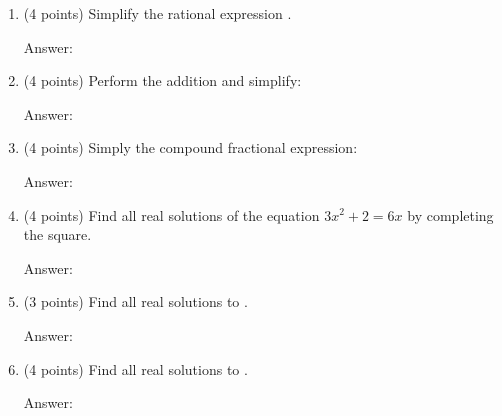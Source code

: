 \documentclass[11pt]{article}
\begin{document}
\begin{enumerate}
\item (4 points) Simplify the rational expression .\\
\begin{flushright}{Answer: \underline{\hspace{2in}}}\end{flushright}

\vspace{1in}

\item (4 points) Perform the addition and simplify: 
\begin{flushright}{Answer: \underline{\hspace{2in}}}\end{flushright}

\vspace{1in}

\item (4 points) Simply the compound fractional expression: 
\begin{flushright}{Answer: \underline{\hspace{2in}}}\end{flushright}

\vspace{1in}

\item  (4 points)  Find all real solutions of the equation $ 3x^2+2=6x$ by completing the square.
\begin{flushright}{Answer: \underline{\hspace{2in}}}\end{flushright}

\vfill

\newpage
\item (3 points) Find all real solutions to \scalebox{1.4}{$\vert 3x-5\vert=13$}.
\begin{flushright}{Answer: \underline{\hspace{2in}}}\end{flushright}

\vfill
\item (4 points) Find all real solutions to .
\begin{flushright}{Answer: \underline{\hspace{2in}}}\end{flushright}


\end{enumerate}
\end{document}

